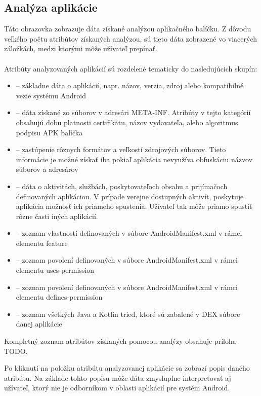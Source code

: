 \subsection{Analýza aplikácie}
Táto obrazovka zobrazuje dáta získané analýzou aplikačného balíčku. Z dôvodu veľkého počtu atribútov získaných analýzou, sú tieto dáta zobrazené vo viacerých záložkách, medzi ktorými môže užívateľ prepínať. 
\\\\
\noindent Atribúty analyzovaných aplikácií sú rozdelené tematicky do nasledujúcich skupín:
\begin{itemize}
	\item {} -- základne dáta o aplikácií, napr. názov, verzia, zdroj alebo kompatibilné vezie systému Android
	\item {} -- dáta získané zo súborov v adresári META-INF. Atribúty v tejto kategórií obsahujú dobu platnosti certifikátu, názov vydavateľa, alebo algoritmus podpisu APK balíčka
	\item {} -- zastúpenie rôznych formátov a veľkostí zdrojových súborov. Tieto informácie je možné získať iba pokiaľ aplikácia nevyužíva obfuskáciu názvov súborov a adresárov
	\item {} -- dáta o aktivitách, službách, poskytovateľoch obsahu a prijímačoch definovaných aplikáciou. V prípade verejne dostupných aktivít, poskytuje aplikácia možnosť ich priameho spustenia. Užívateľ tak môže priamo spustiť rôzne časti iných aplikácií.
	\item {} -- zoznam vlastností definovaných v súbore AndroidManifest.xml v rámci elementu feature
	\item {} -- zoznam povolení definovaných v súbore AndroidManifest.xml v rámci elementu uses-permission
	\item {} -- zoznam povolení definovaných v súbore AndroidManifest.xml v rámci elementu defines-permission
	\item {} -- zoznam všetkých Java a Kotlin tried, ktoré sú zabalené v DEX súbore danej aplikácie
\end{itemize}
Kompletný zoznam atribútov získaných pomocou analýzy obsahuje príloha TODO. 

Po kliknutí na položku atribútu analyzovanej aplikácie sa zobrazí popis daného atribútu. Na základe tohto popisu môže dáta zmysluplne interpretovať aj užívateľ, ktorý nie je odborníkom v oblasti aplikácií pre systém Android.


